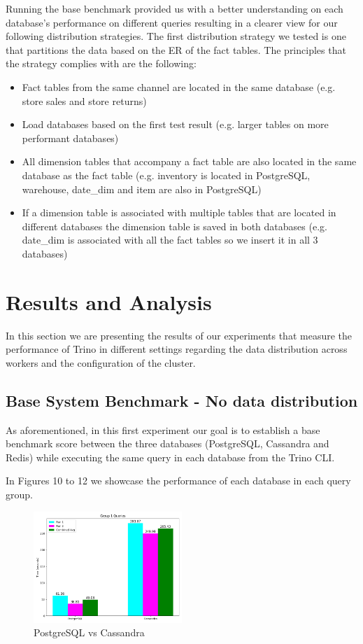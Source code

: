 \documentclass[conference]{IEEEtran}
\begin{document}
Running the base benchmark provided us with a better understanding on each database's performance on different queries resulting in a clearer view for our following distribution strategies. The first distribution strategy we tested is one that partitions the data based on the ER of the fact tables.
The principles that the strategy complies with are the following:
\begin{itemize}
    \item \textbf{} Fact tables from the same channel are located in the same database (e.g. store sales and store returns)
    \item \textbf{} Load databases based on the first test result (e.g. larger tables on more performant databases)
    \item \textbf{} All dimension tables that accompany a fact table are also located in the same database as the fact table (e.g. inventory is located in PostgreSQL, warehouse, date\_dim and item are also in PostgreSQL)
    \item \textbf{} If a dimension table is associated with multiple tables that are located in different databases the dimension table is saved in both databases (e.g. date\_dim is associated with all the fact tables so we insert it in all 3 databases)
\end{itemize}

\section{Results and Analysis}

In this section we are presenting the results of our experiments that measure the performance of Trino in different settings regarding the data distribution across workers and the configuration of the cluster.

\subsection{Base System Benchmark - No data distribution}
\label{sec:no-data-distribution}

As aforementioned, in this first experiment our goal is to establish a base benchmark score between the three databases (PostgreSQL, Cassandra and Redis) while executing the same query in each database from the Trino CLI.

In Figures 10 to 12 we showcase the performance of each database in each query group.

\begin{figure}[h]
    \centering
    \includegraphics[width=0.5\textwidth]{images/DBs_bench_no_distro/group1.png}
    \caption{PostgreSQL vs Cassandra}
    \label{fig:psql-cass-group1}
\end{figure}
\end{document}
